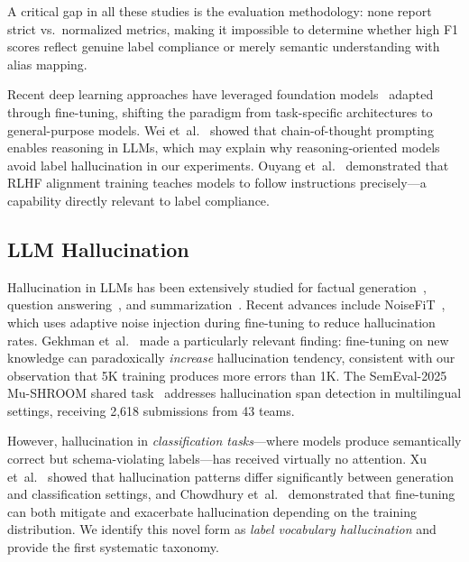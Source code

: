 \documentclass[journal]{IEEEtran}
\begin{document}
A critical gap in all these studies is the evaluation methodology: none report strict vs.\ normalized metrics, making it impossible to determine whether high F1 scores reflect genuine label compliance or merely semantic understanding with alias mapping.

Recent deep learning approaches have leveraged foundation models~\cite{brown2020,touvron2023} adapted through fine-tuning, shifting the paradigm from task-specific architectures to general-purpose models. Wei et~al.~\cite{wei2022} showed that chain-of-thought prompting enables reasoning in LLMs, which may explain why reasoning-oriented models avoid label hallucination in our experiments. Ouyang et~al.~\cite{ouyang2022} demonstrated that RLHF alignment training teaches models to follow instructions precisely---a capability directly relevant to label compliance.

\subsection{LLM Hallucination}
Hallucination in LLMs has been extensively studied for factual generation~\cite{ji2023,huang2023}, question answering~\cite{maynez2020}, and summarization~\cite{cao2022}. Recent advances include NoiseFiT~\cite{noisefit2025}, which uses adaptive noise injection during fine-tuning to reduce hallucination rates. Gekhman et~al.~\cite{gekhman2024} made a particularly relevant finding: fine-tuning on new knowledge can paradoxically \emph{increase} hallucination tendency, consistent with our observation that 5K training produces more errors than 1K. The SemEval-2025 Mu-SHROOM shared task~\cite{mushroom2025} addresses hallucination span detection in multilingual settings, receiving 2,618 submissions from 43 teams.

However, hallucination in \emph{classification tasks}---where models produce semantically correct but schema-violating labels---has received virtually no attention. Xu et~al.~\cite{xu2024} showed that hallucination patterns differ significantly between generation and classification settings, and Chowdhury et~al.~\cite{chowdhury2024} demonstrated that fine-tuning can both mitigate and exacerbate hallucination depending on the training distribution. We identify this novel form as \emph{label vocabulary hallucination} and provide the first systematic taxonomy.
\end{document}
